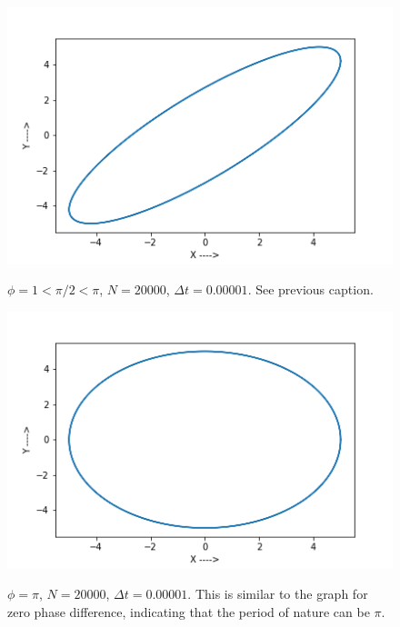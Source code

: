\documentclass{report}
\begin{document}
\begin{figure}[H]
	\centering
	\includegraphics[width = \textwidth]{phi3.png}
	\label{phi3}
	\caption{$\phi=1<\pi/2<\pi$, $N=20000$, $\Delta t=0.00001$. See previous caption.}
\end{figure}


\begin{figure}[H]
	\centering
	\includegraphics[width = \textwidth]{phi4.png}
	\label{phi4}
	\caption{$\phi=\pi$, $N=20000$, $\Delta t=0.00001$. This is similar to the graph for zero phase difference, indicating that the period of nature can be $\pi$.}
\end{figure}
\end{document}
